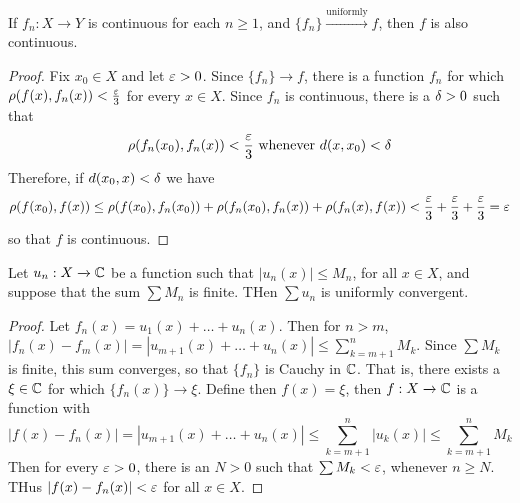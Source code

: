 \begin{theorem}\label{2.5.11}
    If $f_n:X \xrightarrow{} Y$ is continuous for each $n \geq 1$, and
    $\{f_n\} \xrightarrow{\text{uniformly}} f$, then $f$ is also continuous.
\end{theorem}
\begin{proof}
    Fix $x_0 \in X$ and let $\varepsilon>0$. Since  $\{f_n\} \xrightarrow{} f$, there is
    a function $f_n$ for which  $\rho(f(x),f_n(x))<\frac{\varepsilon}{3}$ for every $x
    \in X$. Since  $f_n$ is continuous, there is a  $\delta>0$ such that
    \begin{equation*}
        \rho(f_n(x_0),f_n(x))<\frac{\varepsilon}{3} \text{ whenever } d(x,x_0)<\delta
    \end{equation*}
    Therefore, if $d(x_0,x)<\delta$ we have
    \begin{equation*}
        \rho(f(x_0),f(x)) \leq
        \rho(f(x_0),f_n(x_0))+\rho(f_n(x_0),f_n(x))+\rho(f_n(x),f(x))<
        \frac{\varepsilon}{3}+\frac{\varepsilon}{3}+\frac{\varepsilon}{3}=\varepsilon
    \end{equation*}
    so that $f$ is continuous.
\end{proof}

\begin{theorem}\label{2.5.12}
    Let $u_n:X \xrightarrow{} \mathbb{C}$ be a function such that $|u_n(x)| \leq M_n$, for
    all $x \in X$, and suppose that the sum $\sum{M_n}$ is finite. THen $\sum{u_n}$
    is uniformly convergent.
\end{theorem}
\begin{proof}
    Let $f_n(x)=u_1(x)+\dots+u_n(x)$. Then for $n>m$,
    $|f_n(x)-f_m(x)|=|u_{m+1}(x)+\dots+u_n(x)| \leq \sum_{k=m+1}^n{M_k}$.
    Since $\sum{M_k}$ is finite, this sum converges, so that $\{f_n\}$ is
    Cauchy in $\mathbb{C}$. That is, there exists a  $\xi \in \mathbb{C}$ for which  $\{f_n(x)\}
    \xrightarrow{} \xi$. Define then $f(x)=\xi$, then $f:X \xrightarrow{} \mathbb{C}$ is
    a function with
    \begin{equation*}
        |f(x)-f_n(x)|=|u_{m+1}(x)+\dots+u_n(x)| \leq \sum_{k=m+1}^n{|u_k(x)|}
        \leq \sum_{k=m+1}^n{M_k}
    \end{equation*}
    Then for every $\varepsilon>0$, there is an  $N>0$ such that  $\sum{M_k}<\varepsilon$,
    whenever $n \geq N$. THus  $|f(x)-f_n(x)|<\varepsilon$ for all $x \in X$.
\end{proof}
